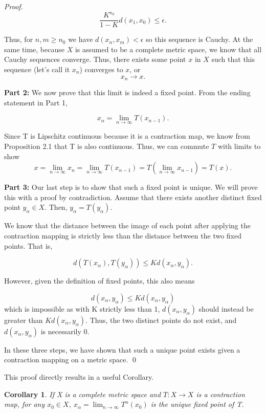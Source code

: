 \documentclass{article}
\newtheorem{corollary}{Corollary}[theorem]
\theoremstyle{remark}
\begin{document}
\begin{proof}
$$\frac{K^{n_0}}{1-K}d(x_1, x_0) \leq \epsilon.$$

Thus, for $n,m \geq n_0$ we have $d(x_n, x_m) <\epsilon$ so this sequence is Cauchy. At the same time, because $X$ is assumed to be a complete metric space, we know that all Cauchy sequences converge. Thus, there exists some point $x$ in $X$ such that this sequence (let's call it $x_n$) converges to $x$, or $$x_n \to x.$$

\textbf{Part 2:} We now prove that this limit is indeed a fixed point.
From the ending statement in Part 1, 

$$x_{\alpha} = \lim_{n \to \infty} T(x_{n-1}).$$

Since T is Lipschitz continuous because it is a contraction map, we know from Proposition 2.1 that T is also continuous. Thus, we can commute $T$ with limits to show
$$x = \lim_{n \to \infty} x_n = \lim_{n \to \infty} T(x_{n-1}) = T(\lim_{n \to \infty} x_{n-1}) = T(x).$$

\textbf{Part 3:} Our last step is to show that such a fixed point is unique. We will prove this with a proof by contradiction. Assume that there exists another distinct fixed point $y_{\alpha} \in X$. Then, $y_{\alpha} = T(y_{\alpha})$.

We know that the distance between the image of each point after applying the contraction mapping is strictly less than the distance between the two fixed points. That is,

$$d(T(x_{\alpha}), T(y_{\alpha})) \leq Kd(x_{\alpha}, y_{\alpha}).$$



However, given the definition of fixed points, this also means

$$d(x_{\alpha}, y_{\alpha}) \leq Kd(x_{\alpha}, y_{\alpha})$$
which is impossible as with K  strictly less than 1, $d(x_{\alpha}, y_{\alpha})$ should instead be greater than $Kd(x_{\alpha}, y_{\alpha})$. Thus, the two distinct points do not exist, and $d(x_{\alpha}, y_{\alpha})$ is necessarily 0.

In these three steps, we have shown that such a unique point exists given a contraction mapping on a metric space.
\qed
\phantom\qedhere
\end{proof}


This proof directly results in a useful Corollary.  \\
\begin{corollary} If X is a complete metric space and $T: X \to X$ is a contraction map, for any $x_0 \in X$, $x_\alpha = \lim_{n \to \infty}T^n(x_0)$ is the unique fixed point of T.
\end{corollary}
\end{document}
